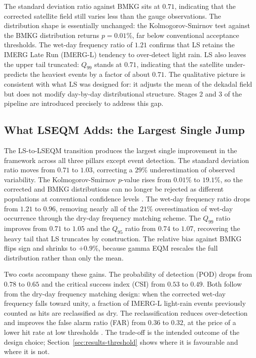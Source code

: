 The standard deviation ratio against BMKG sits at $0.71$,
indicating that the corrected satellite field still varies less
than the gauge observations. The distribution shape is
essentially unchanged: the Kolmogorov-Smirnov test against the
BMKG distribution returns $p = 0.01\%$, far below conventional
acceptance thresholds. The wet-day frequency ratio of $1.21$
confirms that LS retains the IMERG Late Run (IMERG-L) tendency to over-detect
light rain. LS also leaves the upper tail truncated: $Q_{99}$
stands at $0.71$, indicating that the satellite under-predicts
the heaviest events by a factor of about $0.71$. The qualitative
picture is consistent with what LS was designed for: it adjusts
the mean of the dekadal field but does not modify day-by-day
distributional structure. Stages 2 and 3 of the pipeline are
introduced precisely to address this gap.

\subsection*{What LSEQM Adds: the Largest Single Jump}

The LS-to-LSEQM transition produces the largest single
improvement in the framework across all three pillars except
event detection. The standard deviation ratio moves from $0.71$
to $1.03$, correcting a $29\%$ underestimation of observed
variability. The Kolmogorov-Smirnov $p$-value rises from
$0.01\%$ to $19.1\%$, so the corrected and BMKG distributions
can no longer be rejected as different populations at
conventional confidence levels \cite{ref:ebert2007, ref:wilks2020}. The wet-day frequency ratio drops from $1.21$ to
$0.96$, removing nearly all of the $21\%$ overestimation of
wet-day occurrence through the dry-day frequency matching
scheme. The $Q_{99}$ ratio improves from $0.71$ to $1.05$ and
the $Q_{95}$ ratio from $0.74$ to $1.07$, recovering the heavy
tail that LS truncates by construction. The relative bias
against BMKG flips sign and shrinks to $+0.9\%$, because gamma
EQM rescales the full distribution rather than only the mean.

Two costs accompany these gains. The probability of detection
(POD) drops from $0.78$ to $0.65$ and the critical success
index (CSI) from $0.53$ to $0.49$. Both follow from the dry-day
frequency matching design: when the corrected wet-day frequency
falls toward unity, a fraction of IMERG-L light-rain events
previously counted as hits are reclassified as dry. The
reclassification reduces over-detection and improves the false
alarm ratio (FAR) from $0.36$ to $0.32$, at the price of a
lower hit rate at low thresholds \citep{ref:maggioni2016}. The
trade-off is the intended outcome of the design choice;
Section~\ref{sec:results-threshold} shows where it is
favourable and where it is not.

